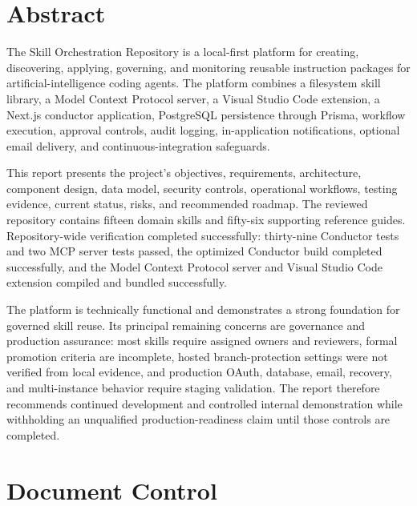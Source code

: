 \documentclass[12pt]{report}
\renewenvironment{abstract}{\chapter*{Abstract}\addcontentsline{toc}{chapter}{Abstract}}{}
\begin{document}
\begin{abstract}
The Skill Orchestration Repository is a local-first platform for creating, discovering, applying, governing, and monitoring reusable instruction packages for artificial-intelligence coding agents. The platform combines a filesystem skill library, a Model Context Protocol server, a Visual Studio Code extension, a Next.js conductor application, PostgreSQL persistence through Prisma, workflow execution, approval controls, audit logging, in-application notifications, optional email delivery, and continuous-integration safeguards.

This report presents the project's objectives, requirements, architecture, component design, data model, security controls, operational workflows, testing evidence, current status, risks, and recommended roadmap. The reviewed repository contains fifteen domain skills and fifty-six supporting reference guides. Repository-wide verification completed successfully: thirty-nine Conductor tests and two MCP server tests passed, the optimized Conductor build completed successfully, and the Model Context Protocol server and Visual Studio Code extension compiled and bundled successfully.

The platform is technically functional and demonstrates a strong foundation for governed skill reuse. Its principal remaining concerns are governance and production assurance: most skills require assigned owners and reviewers, formal promotion criteria are incomplete, hosted branch-protection settings were not verified from local evidence, and production OAuth, database, email, recovery, and multi-instance behavior require staging validation. The report therefore recommends continued development and controlled internal demonstration while withholding an unqualified production-readiness claim until those controls are completed.
\end{abstract}

\chapter*{Document Control}
\end{document}
